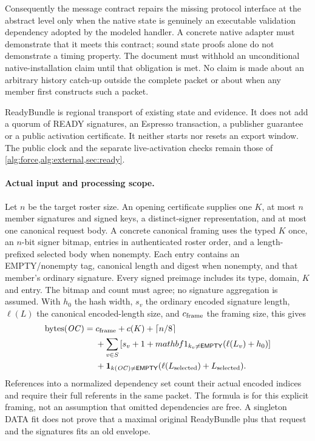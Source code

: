 Consequently the message contract repairs the missing protocol interface
at the abstract level only when the native state is genuinely an executable
validation dependency adopted by the modeled handler. A concrete native
adapter must demonstrate that it meets this contract; sound state proofs
alone do not demonstrate a timing property. The document must withhold
an unconditional native-installation claim until that obligation is met.
No claim is made about an arbitrary history catch-up outside the complete
packet or about when any member first constructs such a packet.

ReadyBundle is regional transport of existing state and evidence. It does
not add a quorum of READY signatures, an Espresso transaction, a publisher
guarantee or a public activation certificate. It neither starts nor resets
an export window. The public clock and the separate live-activation checks
remain those of \cref{alg:force,alg:external,sec:ready}.


\paragraph{Actual input and processing scope.}
\label{sec:input-resource-scope}
Let $n$ be the target roster size. An opening certificate supplies one
$K$, at most $n$ member signatures and signed keys, a distinct-signer
representation, and at most one canonical request body. A concrete
canonical framing uses the typed $K$ once, an $n$-bit signer bitmap,
entries in authenticated roster order, and a length-prefixed selected
body when nonempty. Each entry contains an EMPTY/nonempty tag, canonical
length and digest when nonempty, and that member's ordinary signature.
Every signed preimage includes its type, domain, $K$ and entry. The
bitmap and count must agree; no signature aggregation is assumed.
With $h_0$ the hash width, $s_v$ the ordinary encoded signature length,
$\ell(L)$ the canonical encoded-length size, and $c_{\rm frame}$ the
framing size, this gives
\[
\begin{split}
 \operatorname{bytes}(\mathit{OC})={}&c_{\rm frame}+c(K)+\lceil n/8\rceil\\
 &+\sum_{v\in S}\left[s_v+1+mathbf 1_{k_v\ne\mathsf{EMPTY}}
                 (\ell(L_v)+h_0)\right]\\
 &+\mathbf 1_{k(\mathit{OC})\ne\mathsf{EMPTY}}
                 (\ell(L_{\rm selected})+L_{\rm selected}).
\end{split}
\]
References into a normalized dependency set count their actual encoded
indices and require their full referents in the same packet. The formula
is for this explicit framing, not an assumption that omitted dependencies
are free. A singleton DATA fit does not prove that a maximal original
ReadyBundle plus that request and the signatures fits an old envelope.

